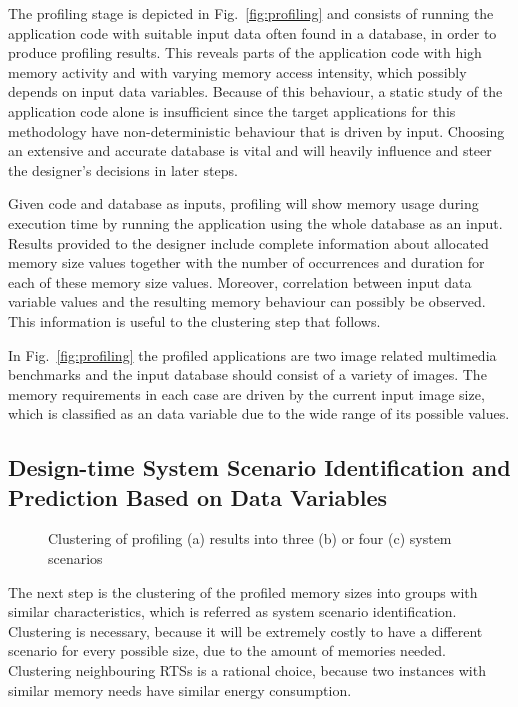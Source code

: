 \documentclass{acm_proc_article-sp}
\begin{document}
The profiling stage is depicted in Fig.~\ref{fig:profiling} and consists of running the application code with suitable input data often found in a database, in order to produce profiling results. This reveals parts of the application code with high memory activity and with varying memory access intensity, which possibly depends on input data variables. Because of this behaviour, a static study of the application code alone is insufficient since the target applications for this methodology have non-deterministic behaviour that is driven by input. Choosing an extensive and accurate database is vital and will heavily influence and steer the designer's decisions in later steps. 

Given code and database as inputs, profiling will show memory usage during execution time by running the application using the whole database as an input. Results provided to the designer include complete information about allocated memory size values together with the number of occurrences and duration for each of these memory size values. Moreover, correlation between input data variable values and the resulting memory behaviour can possibly be observed. This information is useful to the clustering step that follows. 

In Fig.~\ref{fig:profiling} the profiled applications are two image related multimedia benchmarks and the input database should consist of a variety of images. The memory requirements in each case are driven by the current input image size, which is classified as an data variable due to the wide range of its possible values. 

\subsection{Design-time System Scenario Identification and Prediction Based on Data Variables}

\begin{figure}[!t]
\centering
\caption{Clustering of profiling (a) results into three (b) or four (c) system scenarios}
\label{fig:clustering}
\end{figure}

The next step is the clustering of the profiled memory sizes into groups with similar characteristics, which is referred as system scenario identification. Clustering is necessary, because it will be extremely costly to have a different scenario for every possible size, due to the amount of memories needed. Clustering neighbouring RTSs is a rational choice, because two instances with similar memory needs have similar energy consumption. 
\end{document}
